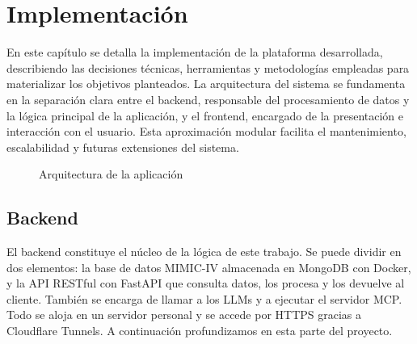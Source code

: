 \chapter{Implementación}


En este capítulo se detalla la implementación de la plataforma desarrollada, describiendo las decisiones técnicas, herramientas y metodologías empleadas para materializar los objetivos planteados. La arquitectura del sistema se fundamenta en la separación clara entre el backend, responsable del procesamiento de datos y la lógica principal de la aplicación, y el frontend, encargado de la presentación e interacción con el usuario. Esta aproximación modular facilita el mantenimiento, escalabilidad y futuras extensiones del sistema. 

\begin{figure}[H]
  \centering
  \caption{Arquitectura de la aplicación}
  \label{fig:arch1}
\end{figure}

\section{Backend}

El backend constituye el núcleo de la lógica de este trabajo. Se puede dividir en dos elementos: la base de datos MIMIC-IV almacenada en MongoDB con Docker, y la API RESTful con FastAPI que consulta datos, los procesa y los devuelve al cliente. También se encarga de llamar a los LLMs y a ejecutar el servidor MCP. Todo se aloja en un servidor personal y se accede por HTTPS gracias a Cloudflare Tunnels. A continuación profundizamos en esta parte del proyecto.

